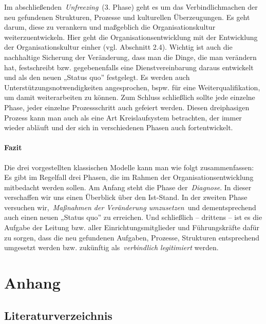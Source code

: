 \documentclass[
  letterpaper,
]{book}
\begin{document}
Im abschließenden~\emph{Unfreezing}~(3. Phase) geht es um das
Verbindlichmachen der neu gefundenen Strukturen, Prozesse und
kulturellen Überzeugungen. Es geht darum, diese zu verankern und
maßgeblich die Organisationskultur weiterzuentwickeln. Hier geht die
Organisationsentwicklung mit der Entwicklung der Organisationskultur
einher (vgl. Abschnitt 2.4). Wichtig ist auch die nachhaltige Sicherung
der Veränderung, dass man die Dinge, die man verändern hat, festschreibt
bzw. gegebenenfalls eine Dienstvereinbarung daraus entwickelt und als
den neuen „Status quo'' festgelegt. Es werden auch
Unterstützungsnotwendigkeiten angesprochen, bspw. für eine
Weiterqualifikation, um damit weiterarbeiten zu können. Zum Schluss
schließlich sollte jede einzelne Phase, jeder einzelne Prozessschritt
auch gefeiert werden. Diesen dreiphasigen Prozess kann man auch als eine
Art Kreislaufsystem betrachten, der immer wieder abläuft und der sich in
verschiedenen Phasen auch fortentwickelt.

\subsection{Fazit}\label{fazit}

Die drei vorgestellten klassischen Modelle kann man wie folgt
zusammenfassen: Es gibt im Regelfall drei Phasen, die im Rahmen der
Organisationsentwicklung mitbedacht werden sollen. Am Anfang steht die
Phase der~\emph{Diagnose}. In dieser verschaffen wir uns einen Überblick
über den Ist-Stand. In der zweiten Phase versuchen wir,~\emph{Maßnahmen
der Veränderung umzusetzen}~und dementsprechend auch einen neuen „Status
quo'' zu erreichen. Und schließlich -- drittens -- ist es die Aufgabe
der Leitung bzw. aller Einrichtungsmitglieder und Führungskräfte dafür
zu sorgen, dass die neu gefundenen Aufgaben, Prozesse, Strukturen
entsprechend umgesetzt werden bzw. zukünftig als~\emph{verbindlich
legitimiert} werden.

\part{Anhang}

\chapter{Literaturverzeichnis}\label{literaturverzeichnis}
\end{document}
